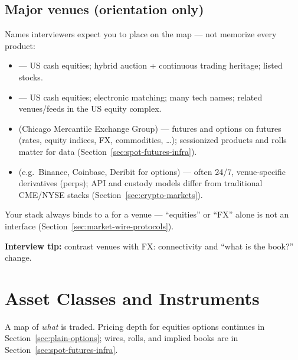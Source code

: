\subsection{Major venues (orientation only)}
\label{subsec:major-venues}
Names interviewers expect you to place on the map --- not memorize every product:
\begin{itemize}
    \item {} --- US cash equities; hybrid auction + continuous trading 
          heritage; listed stocks.
    \item {} --- US cash equities; electronic matching; many tech 
          names; related venues/feeds in the US equity complex.
    \item {} (Chicago Mercantile Exchange Group) --- futures and options 
          on futures (rates, equity indices, FX, commodities, \ldots); sessionized 
          products and rolls matter for data (Section~\ref{sec:spot-futures-infra}).
    \item {} (e.g.\ Binance, Coinbase, Deribit for options) 
          --- often 24/7, venue-specific derivatives (perps); API and custody models 
          differ from traditional CME/NYSE stacks (Section~\ref{sec:crypto-markets}).
\end{itemize}
Your stack always binds to a  
for a venue --- ``equities'' or ``FX'' alone is not an interface 
(Section~\ref{sec:market-wire-protocols}).

\par\noindent\textbf{Interview tip:} contrast  
venues with  FX: connectivity and ``what is the book?'' change.

\section{Asset Classes and Instruments}
\label{sec:instruments}
A map of \emph{what} is traded. Pricing depth for equities options continues in 
Section~\ref{sec:plain-options}; wires, rolls, and implied books are in 
Section~\ref{sec:spot-futures-infra}.

